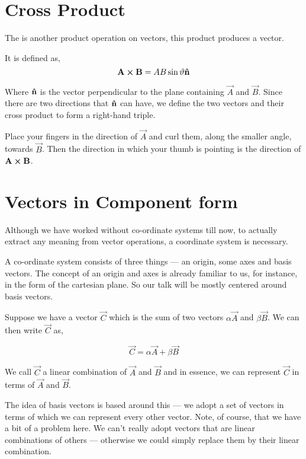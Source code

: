 \section{Cross Product}

The  is another product operation on vectors, this product produces a vector.

It is defined as, 
\[\vec{A} \cp \vec{B} = AB\sin\vartheta \unitv{n}\] 

Where \(\boldsymbol{\mathbf{\hat{n}}}\) is the vector perpendicular to the plane containing \(\vec{A}\) and \(\vec{B}\).
Since there are two directions that \(\boldsymbol{\mathbf{\hat{n}}}\) can have, we define the two vectors 
and their cross product to form a right-hand triple.

Place your fingers in the direction of \(\vec{A}\) and curl them, along the smaller angle, towards 
\(\vec{B}\). Then the direction in which your thumb is pointing is the direction of \(\vec{A} \cp \vec{B}\). 

\section{Vectors in Component form}

Although we have worked without co-ordinate systems till now,
to actually extract any meaning from vector operations, a coordinate system is necessary.

A co-ordinate system consists of three things --- an origin, some axes and basis vectors.
The concept of an origin and axes is already familiar to us, for instance, in the form of the cartesian plane.
So our talk will be mostly centered around basis vectors. 

Suppose we have a vector \(\vec{C}\) which is the sum of two vectors \(\alpha\vec{A}\) and 
\(\beta\vec{B}\). We can then write \(\vec{C}\) as,

\begin{equation*}
    \vec{C} = \alpha\vec{A} + \beta\vec{B}
\end{equation*}

We call \(\vec{C}\) a linear combination of \(\vec{A}\) and \(\vec{B}\) and in essence, 
we can represent \(\vec{C}\) in terms of \(\vec{A}\) and \(\vec{B}\). 

The idea of basis vectors is based around this --- we adopt a set of vectors in terms 
of which we can represent every other vector. Note, of course, that we have 
a bit of a problem here. We can't really adopt vectors that are linear combinations of 
others --- otherwise we could simply replace them by their linear combination.


